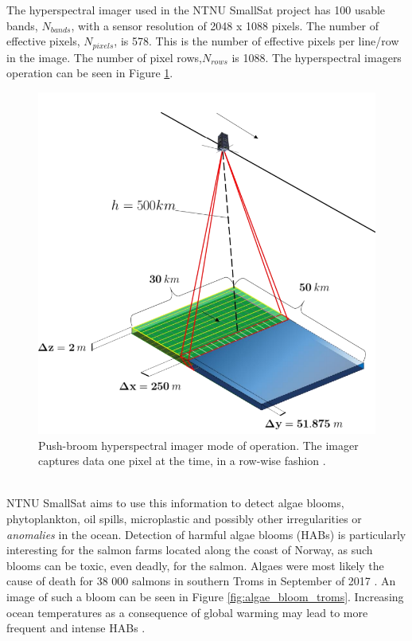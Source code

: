 The hyperspectral imager used in the NTNU SmallSat project has 100 usable bands, $N_{bands}$, with a sensor resolution of 2048 x 1088 pixels. The number of effective pixels, $N_{pixels}$, is 578. This is the number of effective pixels per line/row in the image. The number of pixel rows,$N_{rows}$ is 1088. The hyperspectral imagers operation can be seen in Figure \ref{fig:HSI_functionality}. 
\begin{figure}[H]
\centering
   \includegraphics[scale=0.3]{images/hyperspectral_imager.PNG}
  \caption{ Push-broom hyperspectral imager mode of operation. The imager captures data one pixel at the time, in a row-wise fashion \cite{SmallSat_project_description}. } 
  \label{fig:HSI_functionality}
\end{figure}
\\

NTNU SmallSat aims to use this information to detect algae blooms, phytoplankton, oil spills, microplastic and possibly other irregularities or \textit{anomalies} in the ocean. Detection of harmful algae blooms (HABs) is particularly interesting for the salmon farms located along the coast of Norway, as such blooms can be toxic, even deadly, for the salmon. Algaes were most likely the cause of death for 38 000 salmons in southern Troms in September of 2017 \cite{laksedeath}. An image of such a bloom can be seen in Figure \ref{fig:algae_bloom_troms}. Increasing ocean temperatures as a consequence of global warming may lead to more frequent and intense HABs \cite{climate_change_algae_blooms}. 
\\

